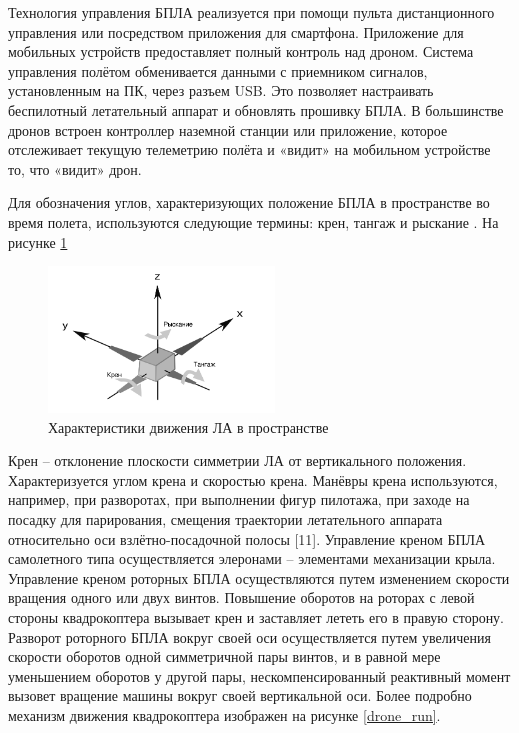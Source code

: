 \documentclass[nir, och, master]{SCWorks}
\begin{document}
Технология управления БПЛА реализуется при помощи пульта дистанционного управления или посредством приложения для смартфона. Приложение для
мобильных устройств предоставляет полный контроль
над дроном. Система управления полётом обменивается данными с приемником сигналов, установленным
на ПК, через разъем USB. Это позволяет настраивать
беспилотный летательный аппарат и обновлять прошивку БПЛА. В большинстве дронов встроен контроллер наземной станции или приложение, которое отслеживает текущую телеметрию полёта и «видит»
на мобильном устройстве то, что «видит» дрон.

Для обозначения углов, характеризующих положение БПЛА в пространстве во время полета, 
используются следующие термины: крен, тангаж и рыскание \cite{11}. 
На рисунке \ref{drone_position}

\begin{figure}[!ht]
	\centering
	\includegraphics[width=6cm]{img/Navigate SCHEME.png}
	\caption{\label{drone_position}%
	Характеристики движения ЛА в пространстве}
\end{figure}

Крен – отклонение плоскости симметрии ЛА от вертикального положения. 
Характеризуется углом крена и скоростью крена. Манёвры крена используются, 
например, при разворотах, при выполнении фигур пилотажа, при заходе на посадку 
для парирования, смещения траектории летательного аппарата относительно оси 
взлётно-посадочной полосы [11]. Управление креном БПЛА самолетного типа 
осуществляется элеронами – элементами механизации крыла. Управление креном 
роторных БПЛА осуществляются путем изменением скорости вращения одного или 
двух винтов. Повышение оборотов на роторах с левой  стороны квадрокоптера 
вызывает крен и заставляет лететь его в правую сторону. Разворот роторного 
БПЛА вокруг своей оси осуществляется путем увеличения скорости оборотов 
одной симметричной пары винтов, и в равной мере уменьшением оборотов у 
другой пары, нескомпенсированный реактивный момент вызовет вращение машины 
вокруг своей вертикальной оси. Более подробно механизм движения квадрокоптера 
изображен на рисунке \ref{drone_run}.
\end{document}
